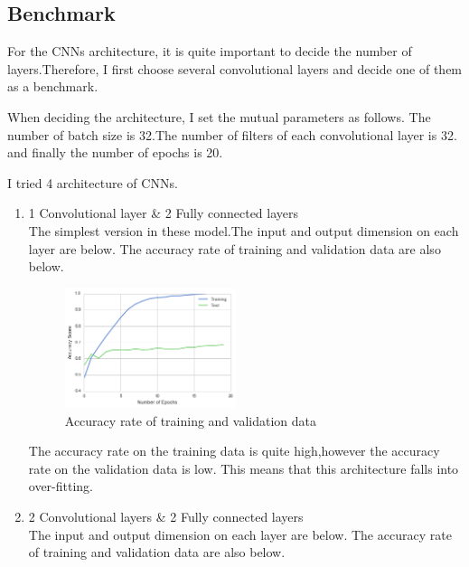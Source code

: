 \subsection{Benchmark}

For the CNNs architecture, it is quite important to decide the number of layers.Therefore, I first choose several convolutional layers and decide one of them as a benchmark.

When deciding the architecture, I set the mutual parameters as follows.
The number of batch size is 32.The number of filters of each convolutional layer is 32. and finally the number of epochs is 20.

I tried 4 architecture of CNNs.

\begin{enumerate}
 \item 1 Convolutional layer \& 2 Fully connected layers \\
 The simplest version in these model.The input and output dimension on each layer are below.
 The accuracy rate of training and validation data are also below.
 
 \begin{figure}[H]

	\begin{center}
	\includegraphics[width=5cm]{picture/1layer_cnn.png}
	\caption{Accuracy rate of training and validation data}
	\end{center}
	\label{fig:eight}

\end{figure}
 
 The accuracy rate on the training data is quite high,however the accuracy rate on the validation data is low. This means that this architecture falls into over-fitting.
 
 
 \item 2 Convolutional layers \& 2 Fully connected layers \\
 The input and output dimension on each layer are below.
 The accuracy rate of training and validation data are also below.
 

\end{enumerate}
